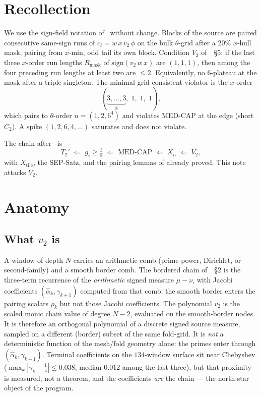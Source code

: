 \documentclass[11pt]{article}
\theoremstyle{remark}
\begin{document}
\section{Recollection}\label{sec:rec}

We use the sign-field notation of~\cite{xn} without change.
Blocks of the source are paired consecutive same-sign runs of
$c_t=w\,x\,v_2\,\phi$ on the bulk $\theta$-grid after a $20\%$
$x$-hull mask, pairing from $x$-min, odd tail its own block.
Condition $V_2$ of~\cite{xn}~\S5: if the last three $x$-order run
lengths $R_{\mathrm{mask}}$ of $\mathrm{sign}(v_2\,w\,x)$ are
$(1,1,1)$, then among the four preceding run lengths at least two
are $\le 2$.  Equivalently, no $6$-plateau at the mask after a
triple singleton.  The minimal grid-consistent violator is the
$x$-order
\[
(\underbrace{3,\ldots,3}_{8},\;1,\;1,\;1),
\]
which pairs to $\theta$-order $n=(1,2,6^4)$ and violates MED-CAP
at the edge (short $C_2$).  A spike $(1,2,6,4,\ldots)$ saturates
and does not violate.

The chain after~\cite{medcap,xn} is
\[
T_2'
 \;\Longleftarrow\;
 g_i\ge\tfrac38
 \;\Longleftarrow\;
 \mathrm{MED\text{-}CAP}
 \;\Longleftarrow\;
 X_n
 \;\Longleftarrow\;
 V_2,
\]
with $X_{\mathrm{tile}}$, the SEP-Satz, and the pairing lemmas of
\cite{xn} already proved.  This note attacks $V_2$.

\section{Anatomy}\label{sec:anatomy}

\subsection{What $v_2$ is}

A window of depth $N$ carries an arithmetic comb (prime-power,
Dirichlet, or second-family) and a smooth border comb.  The
bordered chain of~\cite{xn}~\S2 is the three-term recurrence of
the \emph{arithmetic} signed measure $\mu-\nu$, with Jacobi
coefficients $(\hat\alpha_k,\gamma_{k+1})$ computed from that
comb; the smooth border enters the pairing scalars $\rho_k$ but
not those Jacobi coefficients.  The polynomial $v_2$ is the
scaled monic chain value of degree $N-2$, evaluated on the
smooth-border nodes.  It is therefore an orthogonal polynomial of
a discrete signed source measure, sampled on a different
(border) subset of the same fold-grid.  It is \emph{not} a
deterministic function of the mesh/fold geometry alone: the
primes enter through $(\hat\alpha_k,\gamma_{k+1})$.  Terminal
coefficients on the $134$-window surface sit near Chebyshev
($\max_k|\gamma_k-\tfrac14|\le 0.038$, median $0.012$ among the
last three), but that proximity is measured, not a theorem, and
the coefficients \emph{are} the chain --- the north-star object
of the program.
\end{document}
